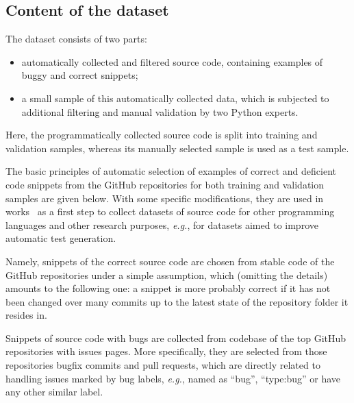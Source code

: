 \documentclass[10pt,conference]{IEEEtran}
\begin{document}
\subsection{Content of the dataset}

The dataset consists of two parts:
\begin{itemize}
\item automatically collected and filtered source code, containing examples of buggy and correct snippets;

\item a small sample of this automatically collected data, which is
subjected to additional filtering and manual validation by two Python experts.
\end{itemize}

Here, the programmatically collected source code is split into training and validation samples, whereas its manually 
selected sample is used as a test sample. 

The basic principles of automatic selection of examples of correct and deficient 
code snippets from the GitHub repositories for both training and validation samples are given below.
With some specific modifications, they are used in works~\cite{FerencEtAl2020,WidyasariEtAl2020} as a first step to collect datasets of source code
for other programming languages and other research purposes, \textit{e.g.}, for datasets aimed to improve automatic test generation.

Namely, snippets of the correct source code are chosen from stable code of the GitHub repositories
under a simple assumption, which (omitting the details) amounts to the following one:
a snippet is more probably correct if it has not been changed over many commits
up to the latest state of the repository folder it resides in. 

Snippets of source code with bugs are collected from codebase of the top GitHub repositories with issues pages.
More specifically, they are selected from those repositories bugfix commits and pull requests, which are directly related to handling issues marked by bug labels, \textit{e.g.}, named as ``bug'', ``type:bug'' or have any other 
similar label. 
\end{document}
